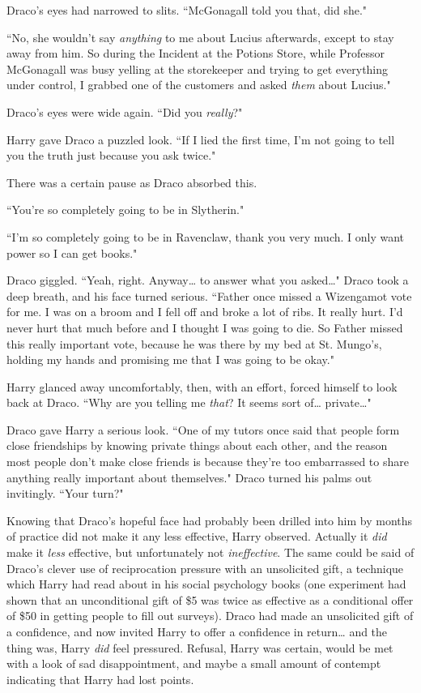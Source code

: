 Draco's eyes had narrowed to slits. ``McGonagall told you that, did she."

``No, she wouldn't say \emph{anything} to me about Lucius afterwards, except to stay away from him. So during the Incident at the Potions Store, while Professor McGonagall was busy yelling at the storekeeper and trying to get everything under control, I grabbed one of the customers and asked \emph{them} about Lucius."

Draco's eyes were wide again. ``Did you \emph{really}?"

Harry gave Draco a puzzled look. ``If I lied the first time, I'm not going to tell you the truth just because you ask twice."

There was a certain pause as Draco absorbed this.

``You're so completely going to be in Slytherin."

``I'm so completely going to be in Ravenclaw, thank you very much. I only want power so I can get books."

Draco giggled. ``Yeah, right. Anyway{\ldots} to answer what you asked{\ldots}" Draco took a deep breath, and his face turned serious. ``Father once missed a Wizengamot vote for me. I was on a broom and I fell off and broke a lot of ribs. It really hurt. I'd never hurt that much before and I thought I was going to die. So Father missed this really important vote, because he was there by my bed at St. Mungo's, holding my hands and promising me that I was going to be okay."

Harry glanced away uncomfortably, then, with an effort, forced himself to look back at Draco. ``Why are you telling me \emph{that}? It seems sort of{\ldots} private{\ldots}"

Draco gave Harry a serious look. ``One of my tutors once said that people form close friendships by knowing private things about each other, and the reason most people don't make close friends is because they're too embarrassed to share anything really important about themselves." Draco turned his palms out invitingly. ``Your turn?"

Knowing that Draco's hopeful face had probably been drilled into him by months of practice did not make it any less effective, Harry observed. Actually it \emph{did} make it \emph{less} effective, but unfortunately not \emph{ineffective}. The same could be said of Draco's clever use of reciprocation pressure with an unsolicited gift, a technique which Harry had read about in his social psychology books (one experiment had shown that an unconditional gift of \$5 was twice as effective as a conditional offer of \$50 in getting people to fill out surveys). Draco had made an unsolicited gift of a confidence, and now invited Harry to offer a confidence in return{\ldots} and the thing was, Harry \emph{did} feel pressured. Refusal, Harry was certain, would be met with a look of sad disappointment, and maybe a small amount of contempt indicating that Harry had lost points.

